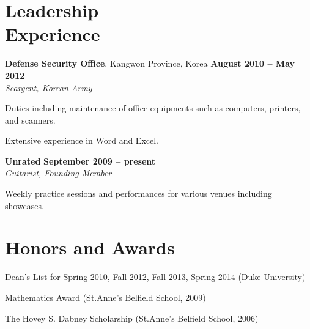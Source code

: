 \documentclass[10pt,margin,line]{cv}
\begin{document}
\begin{resume}
    \section{\mysidestyle Leadership\\Experience}
    \textbf{Defense Security Office}, Kangwon Province, Korea \hfill \textbf{August 2010 -- May 2012}\vspace{1mm}\\\vspace{0mm}%
    \textsl{Seargent, Korean Army}
    \vspace{-2mm}\\\vspace{-1mm}%
    \begin{list3}
        \item Duties including maintenance of office equipments such as computers, printers, and scanners.
        \item Extensive experience in Word and Excel.
  \end{list3}
    \textbf{Unrated}  \hfill \textbf{September 2009 -- present}\vspace{1mm}\\\vspace{0mm}%
    \textsl{Guitarist, Founding Member}
    \vspace{-2mm}\\\vspace{-1mm}%

    \begin{list3}
        \item Weekly practice sessions and performances for various venues including showcases.
  \end{list3}
    \section{\mysidestyle Honors and Awards}
    \begin{list3}
        \item Dean's List for Spring 2010, Fall 2012, Fall 2013, Spring 2014 (Duke University)
        \item Mathematics Award (St.Anne's Belfield School, 2009)
        \item The Hovey S. Dabney Scholarship (St.Anne's Belfield School, 2006)
    \end{list3}


\end{resume}
\end{document}
